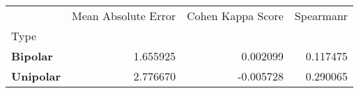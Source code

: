 \begin{table}[H]
\begin{tabular}{lrrr}
\toprule
 & Mean Absolute Error & Cohen Kappa Score & Spearmanr \\
Type &  &  &  \\
\midrule
\textbf{Bipolar} & 1.655925 & 0.002099 & 0.117475 \\
\textbf{Unipolar} & 2.776670 & -0.005728 & 0.290065 \\
\bottomrule
\end{tabular}
\end{table}
